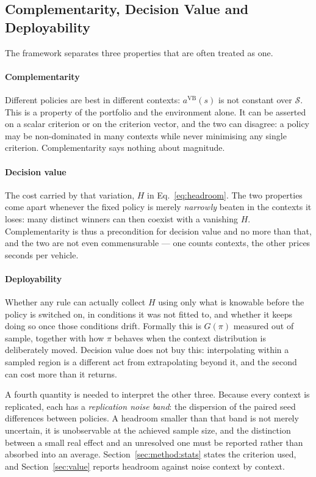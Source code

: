 \subsection{Complementarity, Decision Value and Deployability}
\label{sec:problem:three}

The framework separates three properties that are often treated as one.

\paragraph{Complementarity} Different policies are best in different contexts:
$a^{\mathrm{VB}}(s)$ is not constant over $\mathcal{S}$. This is a property of
the portfolio and the environment alone. It can be asserted on a scalar
criterion or on the criterion vector, and the two can disagree: a policy may be
non-dominated in many contexts while never minimising any single criterion.
Complementarity says nothing about magnitude.

\paragraph{Decision value} The cost carried by that variation, $H$ in
Eq.~\eqref{eq:headroom}. The two properties come apart whenever the fixed policy
is merely \emph{narrowly} beaten in the contexts it loses: many distinct winners
can then coexist with a vanishing $H$. Complementarity is thus a precondition
for decision value and no more than that, and the two are not even commensurable
--- one counts contexts, the other prices seconds per vehicle.

\paragraph{Deployability} Whether any rule can actually collect $H$ using only
what is knowable before the policy is switched on, in conditions it was not
fitted to, and whether it keeps doing so once those conditions drift. Formally
this is $G(\pi)$ measured out of sample, together with how $\pi$ behaves when the
context distribution is deliberately moved. Decision value does not buy this:
interpolating within a sampled region is a different act from extrapolating
beyond it, and the second can cost more than it returns.

A fourth quantity is needed to interpret the other three. Because every context
is replicated, each has a \emph{replication noise band}: the dispersion of the
paired seed differences between policies. A headroom smaller than that band is
not merely uncertain, it is unobservable at the achieved sample size, and the
distinction between a small real effect and an unresolved one must be reported
rather than absorbed into an average. Section~\ref{sec:method:stats} states the
criterion used, and Section~\ref{sec:value} reports headroom against noise
context by context.
